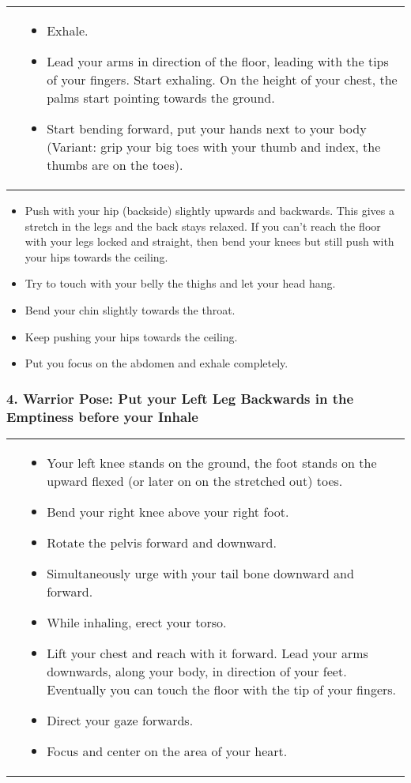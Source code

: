 \documentclass[../Book.Stress_regulation.tex]{subfiles}
\begin{document}
\begin{tabular}{p{1.3cm} p{10.3cm} }
  \raisebox{-1.1\totalheight}{\texttt{[image: SS\_ForwardBend]}}
  &
\begin{itemize}
\item Exhale.
\item Lead your arms in direction of the floor, leading with the tips of your fingers. Start exhaling.
  On the height of your chest, the palms start pointing towards the ground. 
\item Start bending forward, put your hands next to your body (Variant: grip your big toes with your thumb  and index, the thumbs are on the toes).
\end{itemize}
\end{tabular}
\noindent \vspace{-5mm}
\begin{itemize}
\item Push with your hip (backside) slightly upwards and backwards. This gives a stretch in the legs and the back stays relaxed.
  If you can't reach the floor with your legs locked and straight, then bend your knees but still push with your hips towards the ceiling.
\item Try to touch with your belly the thighs and let your head hang.
\item Bend your chin slightly towards the throat.
\item Keep pushing your hips towards the ceiling.
\item Put you focus on the abdomen and exhale completely.  
\end{itemize}
  



\subsubsection{4. Warrior Pose: Put your Left Leg Backwards in the Emptiness before your Inhale}
\begin{tabular}{p{5.5cm} p{6cm} }
  \raisebox{-1.1\totalheight}{\texttt{[image: SS\_Warrior]}}
  &
\begin{itemize}
\item Your left knee stands on the ground, the foot stands on the upward flexed (or later on on the stretched out) toes.
\item Bend your right knee above your right foot.
\item Rotate the pelvis forward and downward.
\item Simultaneously urge with your tail bone downward and forward.
\item While inhaling, erect your torso.
\item Lift your chest and reach with it forward. Lead your arms downwards, along your body, in direction of your feet.
  Eventually you can touch the floor with the tip of your fingers.
\item Direct your gaze forwards.
\item Focus and center on the area of your heart.    
\end{itemize}
\end{tabular}
\end{document}

